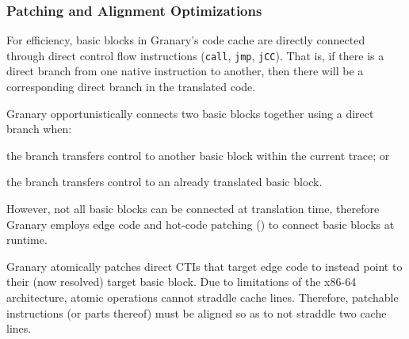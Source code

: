\documentclass[preprint]{sigplanconf}
\begin{document}





\subsubsection{Patching and Alignment  Optimizations}\label{sec:patching}
For efficiency, basic blocks in Granary's code cache are directly connected through direct control flow instructions (\texttt{call}, \texttt{jmp}, \texttt{jCC}). That is, if there is a direct branch from one native instruction to another, then there will be a corresponding direct branch in the translated code.

Granary opportunistically connects two basic blocks together using a direct branch when: \begin{inparaenum}[i)]
	\item the branch transfers control to another basic block within the current trace; or
	\item the branch transfers control to an already translated basic block.
\end{inparaenum} However, not all basic blocks can be connected at translation time, therefore Granary employs edge code and hot-code patching () to connect basic blocks at runtime.

Granary atomically patches direct CTIs that target edge code to instead point to their (now resolved) target basic block. Due to limitations of the x86-64 architecture, atomic operations cannot straddle cache lines. Therefore, patchable instructions (or parts thereof) must be aligned so as to not straddle two cache lines.
\end{document}
